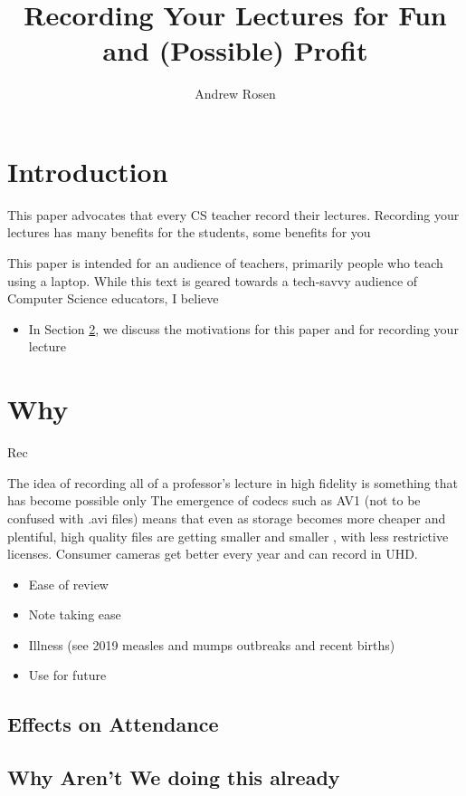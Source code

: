 \documentclass[sigconf]{acmart}
\title{Recording Your Lectures for Fun and (Possible) Profit}
\author{Andrew Rosen}
\affiliation{\institution{Temple University}}
\begin{document}
\maketitle



\section{Introduction}


This paper advocates that every CS teacher record their lectures.
Recording your lectures has many benefits for the students, some benefits for you \cite{Nobody06}

This paper is intended for an audience of teachers, primarily people who teach using a laptop.
While this text is geared towards a tech-savvy audience of Computer Science educators, I believe 




\begin{itemize}
	\item In Section \ref{why}, we discuss the motivations for this paper and for recording your lecture
\end{itemize}
\section{Why}
\label{why}
Rec


The idea of recording all of a professor's lecture in high fidelity is something that has become possible only 
The emergence of codecs such as AV1 (not to be confused with .avi files) means that even as storage becomes more cheaper and plentiful, high quality files are getting smaller and smaller \cite{AV1comp}, with less restrictive licenses. 
Consumer cameras get better every year and can record in UHD.


\begin{itemize}
	\item Ease of review
	\item Note taking ease
	\item Illness (see 2019  measles and mumps outbreaks and recent births)
	\item Use for future 
\end{itemize}

\subsection{Effects on Attendance}


\subsection{Why Aren't We doing this already}
\end{document}
